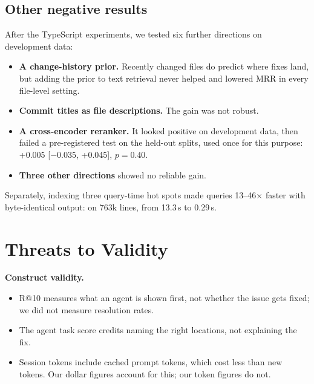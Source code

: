 \documentclass[sigconf,nonacm]{acmart}
\makeatletter
\newcommand{\rat}{R@10\xspace}
\makeatother
\begin{document}
\subsection{Other negative results}
After the TypeScript experiments, we tested six further directions on development data:
\begin{itemize}
\item \textbf{A change-history prior.} Recently changed files do predict where fixes land, but adding the prior to text retrieval never helped and lowered MRR in every file-level setting.
\item \textbf{Commit titles as file descriptions.} The gain was not robust.
\item \textbf{A cross-encoder reranker.} It looked positive on development data, then failed a pre-registered test on the held-out splits, used once for this purpose: +0.005 [$-0.035$, +0.045], $p = 0.40$.
\item \textbf{Three other directions} showed no reliable gain.
\end{itemize}
Separately, indexing three query-time hot spots made queries 13--46$\times$ faster with byte-identical output: on 763k lines, from 13.3\,s to 0.29\,s.

\section{Threats to Validity}

\par\smallskip\noindent\textbf{Construct validity.}
\begin{itemize}
\item \rat measures what an agent is shown first, not whether the issue gets fixed; we did not measure resolution rates.
\item The agent task score credits naming the right locations, not explaining the fix.
\item Session tokens include cached prompt tokens, which cost less than new tokens. Our dollar figures account for this; our token figures do not.
\end{itemize}
\end{document}
